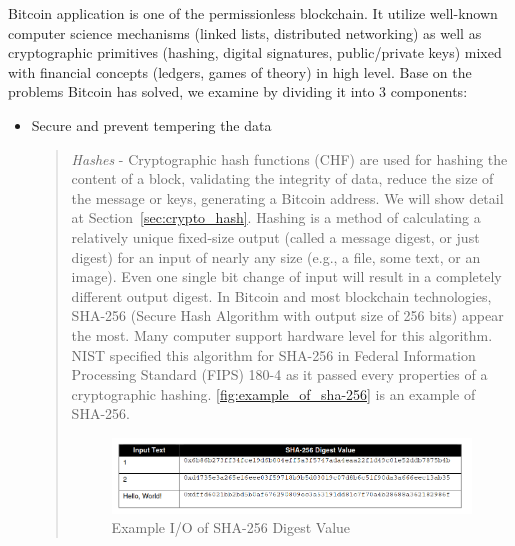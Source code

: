 Bitcoin application is one of the permissionless blockchain.
It utilize well-known computer science mechanisms (linked lists, distributed networking) as well as cryptographic primitives (hashing, digital signatures, public/private keys) mixed with financial concepts (ledgers, games of theory) in high level.
Base on the problems Bitcoin has solved, we examine by dividing it into 3 components:

\begin{itemize}
  \item Secure and prevent tempering the data

        \begin{quote}
          \emph{Hashes} -
          Cryptographic hash functions (CHF) are used for hashing the content of a block, validating the integrity of data, reduce the size of the message or keys, generating a Bitcoin address. We will show detail at Section~\ref{sec:crypto_hash}.
          Hashing is a method of calculating a relatively unique fixed-size output (called a message digest, or just digest) for an input of nearly any size (e.g., a file, some text, or an image).
          Even one single bit change of input will result in a completely different output digest.
          In Bitcoin and most blockchain technologies, SHA-256 (Secure Hash Algorithm with output size of 256 bits) appear the most. Many computer support hardware level for this algorithm.
          NIST specified this algorithm for SHA-256 in Federal Information Processing Standard (FIPS) 180-4 \cite{DBLP:journals/cryptologia/Dang13} as it passed every properties of a cryptographic hashing.
          \autoref{fig:example_of_sha-256} is an example of SHA-256.

          \begin{figure}[ht!]
            \centering
            \includegraphics[width=1\textwidth]{images/example_of_sha-256.png}
            \caption[Example input and output of SHA-256 Digest Value]{Example I/O of SHA-256 Digest Value}
            \label{fig:example_of_sha-256}
          \end{figure}

          \bigbreak


\end{quote}
\end{itemize}
